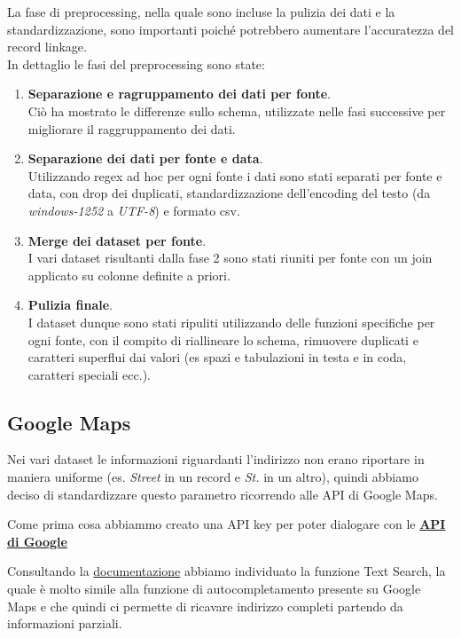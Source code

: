 \documentclass[a4paper,12pt]{article}
\begin{document}
\noindent La fase di preprocessing, nella quale sono incluse la pulizia dei dati e la standardizzazione, sono importanti poiché potrebbero aumentare l'accuratezza del record linkage.\\
In dettaglio le fasi del preprocessing sono state: %
\begin{enumerate}
	\item \textbf{Separazione e ragruppamento dei dati per fonte}.\\Ciò ha mostrato le differenze sullo schema, utilizzate nelle fasi successive per migliorare il raggruppamento dei dati.
	\item \textbf{Separazione dei dati per fonte e data}.\\Utilizzando regex ad hoc per ogni fonte i dati sono stati separati per fonte e data, con drop dei duplicati, standardizzazione dell'encoding del testo (da \textit{windows-1252} a \textit{UTF-8}) e formato csv.
	\item \textbf{Merge dei dataset per fonte}.\\I vari dataset risultanti dalla fase 2 sono stati riuniti per fonte con un join applicato su colonne definite a priori. 
	\item \textbf{Pulizia finale}.\\I dataset dunque sono stati ripuliti utilizzando delle funzioni specifiche per ogni fonte, con il compito di riallineare lo schema, rimuovere duplicati e caratteri superflui dai valori (es spazi e tabulazioni in testa e in coda, caratteri speciali ecc.).  
\end{enumerate}

\subsection{Google Maps}
Nei vari dataset le informazioni riguardanti l'indirizzo non erano riportare in maniera uniforme (es. \textit{Street} in un record e \textit{St.} in un altro), quindi abbiamo deciso di standardizzare questo parametro ricorrendo alle API di Google Maps.

\noindent Come prima cosa abbiammo creato una API key per poter dialogare con le 
\textbf{\href{https://console.cloud.google.com/google/maps-apis/overview?project=feisty-nectar-281812&folder=&organizationId=}{API di Google}}


\noindent Consultando la \href{https://developers.google.com/places/web-service/search}{documentazione} abbiamo individuato la funzione 
Text Search, la quale è molto simile alla funzione di autocompletamento presente su Google Maps e che quindi ci permette di ricavare indirizzo completi partendo da informazioni parziali.
\end{document}
